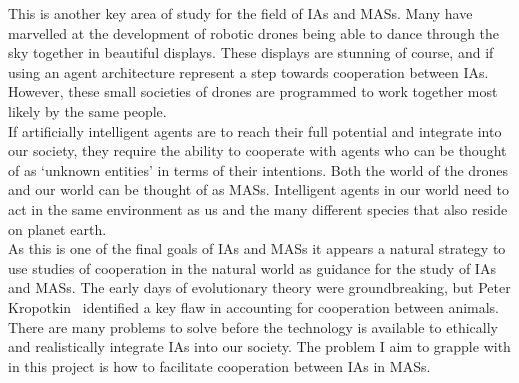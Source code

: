 \documentclass[]{final_report}
\begin{document}
This is another key area of study for the field of IAs and MASs. Many have marvelled at the development of robotic drones being able to dance through the sky together in beautiful displays. These displays are stunning of course, and if using an agent architecture represent a step towards cooperation between IAs. However, these small societies of drones are programmed to work together most likely by the same people.\\
If artificially intelligent agents are to reach their full potential and integrate into our society, they require the ability to cooperate with agents who can be thought of as `unknown entities' in terms of their intentions. Both the world of the drones and our world can be thought of as MASs. Intelligent agents in our world need to act in the same environment as us and the many different species that also reside on planet earth.\\
As this is one of the final goals of IAs and MASs it appears a natural strategy to use studies of cooperation in the natural world as guidance for the study of IAs and MASs. The early days of evolutionary theory were groundbreaking, but Peter Kropotkin~\cite{kropotkin1902mutual} identified a key flaw in accounting for cooperation between animals.\\
There are many problems to solve before the technology is available to ethically and realistically integrate IAs into our society. The problem I aim to grapple with in this project is how to facilitate cooperation between IAs in MASs.
\end{document}
